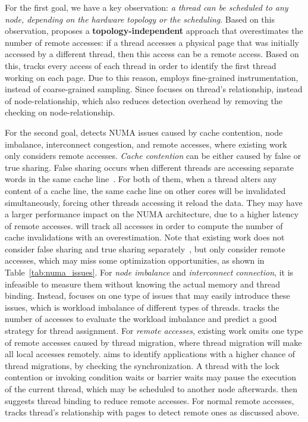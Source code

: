 For the first goal, we have a key observation: \textit{a thread can be scheduled to any node, depending on the hardware topology or the scheduling}. Based on this observation, \NP{} proposes a \textbf{topology-independent} approach that overestimates the number of remote accesses: if a thread accesses a physical page that was initially accessed by a different thread, then this access can be a remote access.
Based on this, \NP{} tracks every access of each thread in order to identify the first thread working on each page. Due to this reason, \NP{} employs fine-grained instrumentation, instead of coarse-grained sampling. Since \NP{} focuses on thread's relationship, instead of node-relationship, which also reduces detection overhead by removing the checking on node-relationship. 

For the second goal, \NP{} detects NUMA issues caused by cache contention, node imbalance, interconnect congestion, and remote accesses, where existing work only considers remote accesses.  \textit{Cache contention} can be either caused by false or true sharing. False sharing occurs when different threads are accessing separate words in the same cache line~\cite{Hoard}. For both of them, when a thread alters any content of a cache line, the same cache line on other cores will be invalidated simultaneously,  forcing other threads accessing it reload the data. They may have a larger performance impact on the NUMA architecture, due to a higher latency of remote accesses. \NP{} will track all accesses in order to compute the number of cache invalidations with an overestimation. Note that  existing work does not consider false sharing and true sharing separately~\cite{XuNuma, valat:2018:numaprof}, but only consider remote accesses, which may miss some optimization opportunities, as shown in Table~\ref{tab:numa_issues}.  For \textit{node imbalance} and \textit{interconnect connection}, it is infeasible to measure them without knowing the actual memory and thread binding. Instead, \NP{} focuses on one type of issues that may easily introduce these issues, which is workload imbalance of different types of threads. \NP{} tracks the number of accesses to evaluate the workload imbalance and predict a good strategy for thread assignment.  For \textit{remote accesses}, existing work omits one type of remote accesses caused by thread migration, where thread migration will make all local accesses remotely. 
\NP{} aims to identify applications with a higher chance of thread migrations, by checking the synchronization. A thread with the lock contention or invoking condition waits or barrier waits may pause the execution of the current thread, which may be scheduled to another node afterwards.  \NP{} then suggests thread binding to reduce remote accesses. For normal remote accesses, \NP{} tracks thread's relationship with pages to detect remote ones as discussed above. 

